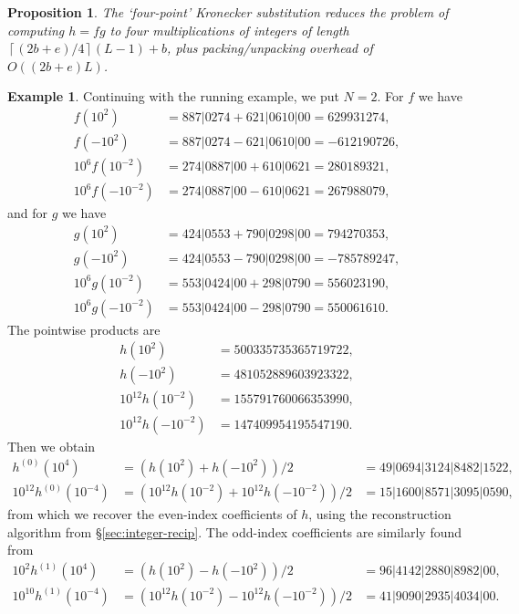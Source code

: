 \documentclass{amsart}
\newcommand{\ceil}[1]{\left\lceil{#1}\right\rceil}
\newtheorem{prop}[thm]{Proposition}
\theoremstyle{definition}
\newtheorem{example}[thm]{Example}
\theoremstyle{remark}
\begin{document}
\begin{prop}
\label{prop:integer-four-ks}
The `four-point' Kronecker substitution reduces the problem of computing $h = fg$ to four multiplications of integers of length $\ceil{(2b+e)/4}(L-1) + b$, plus packing/unpacking overhead of $O((2b+e)L)$.
\end{prop}

\begin{example}
Continuing with the running example, we put $N = 2$. For $f$ we have
\begin{align*}
  f(10^2) & = 887|0274 + 621|0610|00 = 629931274, \\
  f(-10^2) & = 887|0274 - 621|0610|00 = -612190726, \\
  10^6 f(10^{-2}) & = 274|0887|00 + 610|0621 = 280189321, \\
  10^6 f(-10^{-2}) & = 274|0887|00 - 610|0621 = 267988079,
\end{align*}
and for $g$ we have
\begin{align*}
  g(10^2) & = 424|0553 + 790|0298|00 = 794270353, \\
  g(-10^2) & = 424|0553 - 790|0298|00 = -785789247, \\
  10^6 g(10^{-2}) & = 553|0424|00 + 298|0790 = 556023190, \\
  10^6 g(-10^{-2}) & = 553|0424|00 - 298|0790 = 550061610.
\end{align*}
The pointwise products are
\begin{align*}
  h(10^2) & = 500335735365719722, \\
  h(-10^2) & = 481052889603923322, \\
  10^{12} h(10^{-2}) & = 155791760066353990, \\
  10^{12} h(-10^{-2}) & = 147409954195547190.
\end{align*}
Then we obtain
\begin{align*}
  h^{(0)}(10^4) & = (h(10^2) + h(-10^2))/2 & = 49|0694|3124|8482|1522, \\
  10^{12} h^{(0)}(10^{-4}) & = (10^{12} h(10^{-2}) + 10^{12} h(-10^{-2}))/2 & = 15|1600|8571|3095|0590,
\end{align*}
from which we recover the even-index coefficients of $h$, using the reconstruction algorithm from \S\ref{sec:integer-recip}. The odd-index coefficients are similarly found from
\begin{align*}
  10^2 h^{(1)}(10^4) & = (h(10^2) - h(-10^2))/2 & = 96|4142|2880|8982|00, \\
  10^{10} h^{(1)}(10^{-4}) & = (10^{12} h(10^{-2}) - 10^{12} h(-10^{-2}))/2 & = 41|9090|2935|4034|00.
\end{align*}
\end{example}
\end{document}
